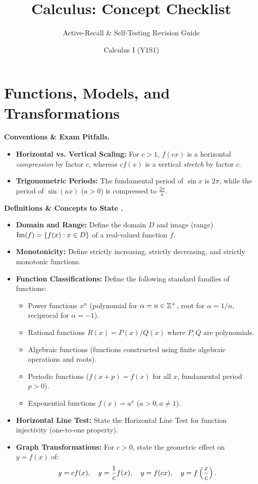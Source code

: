 \documentclass{natsirt}
\title{Calculus: Concept Checklist}
\author{Calculus I (Y1S1)}
\subtitle{Active-Recall \& Self-Testing Revision Guide}
\newcounter{topic}[section]
\newenvironment{recallbox}[1][]{%
    \begin{bluebox}[#1]\refstepcounter{topic}\textbf{Definitions \& Concepts to State \thesection.\thetopic}%
}{\end{bluebox}}
\newenvironment{warningbox}[1][]{\begin{whitebox}[#1]\textbf{Conventions \& Exam Pitfalls. }}{\end{whitebox}}
\newcommand{\citem}{\item[$\square$]}
\newcommand{\Img}{\operatorname{Im}}
\begin{document}
\section{Functions, Models, and Transformations}

\begin{warningbox}
    \begin{itemize}
        \citem \textbf{Horizontal vs. Vertical Scaling:} For $c > 1$, $f(cx)$ is a horizontal \emph{compression} by factor $c$, whereas $c f(x)$ is a vertical \emph{stretch} by factor $c$.
        \citem \textbf{Trigonometric Periods:} The fundamental period of $\sin x$ is $2\pi$, while the period of $\sin(ax)$ ($a > 0$) is compressed to $\frac{2\pi}{a}$.
    \end{itemize}
\end{warningbox}

\begin{recallbox}
    \begin{itemize}
        \citem \textbf{Domain and Range:} Define the domain $D$ and image (range) $\Img(f) = \set{f(x) : x \in D}$ of a real-valued function $f$.
        \citem \textbf{Monotonicity:} Define strictly increasing, strictly decreasing, and strictly monotonic functions.
        \citem \textbf{Function Classifications:} Define the following standard families of functions:
        \begin{itemize}
            \item Power functions $x^\alpha$ (polynomial for $\alpha = n \in \mathbb{Z}^+$, root for $\alpha = 1/n$, reciprocal for $\alpha = -1$).
            \item Rational functions $R(x) = P(x)/Q(x)$ where $P, Q$ are polynomials.
            \item Algebraic functions (functions constructed using finite algebraic operations and roots).
            \item Periodic functions ($f(x + p) = f(x)$ for all $x$, fundamental period $p > 0$).
            \item Exponential functions $f(x) = a^x$ ($a > 0, a \neq 1$).
        \end{itemize}
        \citem \textbf{Horizontal Line Test:} State the Horizontal Line Test for function injectivity (one-to-one property).
        \citem \textbf{Graph Transformations:} For $c > 0$, state the geometric effect on $y = f(x)$ of:
        \begin{align*}
            y = c f(x), \quad y = \frac{1}{c} f(x), \quad y = f(cx), \quad y = f\left( \frac{x}{c} \right).
        \end{align*}
    \end{itemize}
\end{recallbox}
\end{document}
